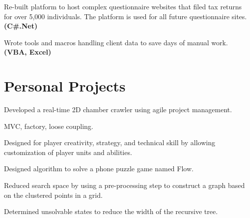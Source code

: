 \documentclass[letterpaper]{kevin-resume} %
\begin{document}
\begin{minipage}[t]{0.66\textwidth}
\sectionspace %


\begin{tightitemize}
	\item Re-built platform to host complex questionnaire websites that filed tax returns for over 5,000 individuals. The platform is used for all future questionnaire sites. \textbf{(C\#.Net)}
	\item Wrote tools and macros handling client data to save days of manual work. \textbf{(VBA, Excel)}
\end{tightitemize}

\sectionspace %


\section{Personal Projects}

\begin{tightitemize}
	\item Developed a real-time 2D chamber crawler using agile project management.
	\item MVC, factory, loose coupling.
	\item Designed for player creativity, strategy, and technical skill by allowing customization of player units and abilities.
\end{tightitemize}

\sectionspace %


\begin{tightitemize}
	\item Designed algorithm to solve a phone puzzle game named Flow.
 	\item Reduced search space by using a pre-processing step to construct a graph based on the clustered points in a grid.
 	\item Determined unsolvable states to reduce the width of the recursive tree.
\end{tightitemize}


\end{minipage}
\end{document}
